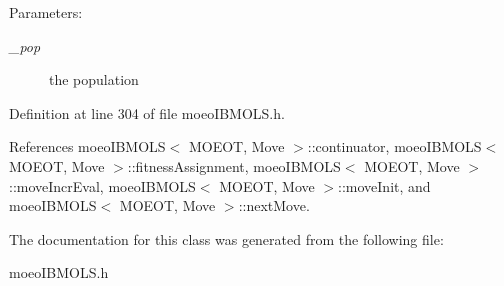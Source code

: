 \begin{Desc}
\item[Parameters:]
\begin{description}
\item[{\em \_\-pop}]the population \end{description}
\end{Desc}


Definition at line 304 of file moeo\-IBMOLS.h.

References moeo\-IBMOLS$<$ MOEOT, Move $>$::continuator, moeo\-IBMOLS$<$ MOEOT, Move $>$::fitness\-Assignment, moeo\-IBMOLS$<$ MOEOT, Move $>$::move\-Incr\-Eval, moeo\-IBMOLS$<$ MOEOT, Move $>$::move\-Init, and moeo\-IBMOLS$<$ MOEOT, Move $>$::next\-Move.

The documentation for this class was generated from the following file:\begin{CompactItemize}
\item 
moeo\-IBMOLS.h\end{CompactItemize}
